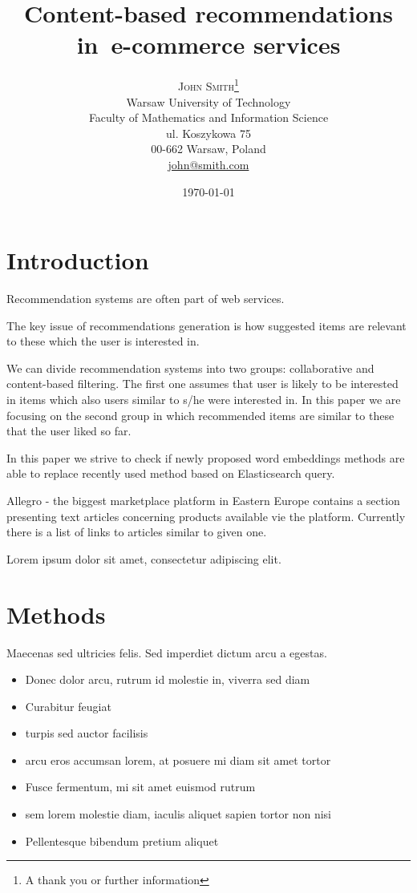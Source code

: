 \documentclass[twoside,twocolumn]{article}
\title{Content-based recommendations in~e-commerce services} %
\author{%
	\textsc{John Smith}\thanks{A thank you or further information} \\[1ex] %
	\normalsize Warsaw University of Technology \\ %
	\normalsize Faculty of Mathematics and Information Science \\
	\normalsize ul. Koszykowa 75 \\
	\normalsize 00-662 Warsaw, Poland \\
	\normalsize \href{mailto:john@smith.com}{john@smith.com} %
}
\date{\today} %
\begin{document}
	
	\maketitle

	\section{Introduction}
	
	Recommendation systems are often part of web services. 
	
	The key issue of recommendations generation is how suggested items are relevant to these which the user is interested in. 
	
	We can divide recommendation systems into two groups: collaborative and  content-based filtering. The first one assumes that user is likely to be interested in items which also users similar to s/he were interested in. In this paper we are focusing on the second group in which recommended items are similar to these that the user liked so far.
	
	In this paper we strive to check if newly proposed word embeddings methods are able to replace recently used method based on Elasticsearch query.
	
	Allegro - the biggest marketplace platform in Eastern Europe contains a section presenting text articles concerning products available vie the platform. Currently there is a list of links to articles similar to given one. 
	
	\lettrine[nindent=0em,lines=3]{L} orem ipsum dolor sit amet, consectetur adipiscing elit.
	\blindtext %
	
	\blindtext %
	
	
	\section{Methods}
	
	Maecenas sed ultricies felis. Sed imperdiet dictum arcu a egestas. 
	\begin{itemize}
		\item Donec dolor arcu, rutrum id molestie in, viverra sed diam
		\item Curabitur feugiat
		\item turpis sed auctor facilisis
		\item arcu eros accumsan lorem, at posuere mi diam sit amet tortor
		\item Fusce fermentum, mi sit amet euismod rutrum
		\item sem lorem molestie diam, iaculis aliquet sapien tortor non nisi
		\item Pellentesque bibendum pretium aliquet
	\end{itemize}
	\blindtext %
	
\end{document}
